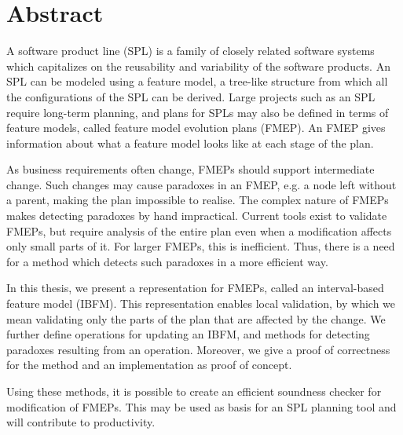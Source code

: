 \chapter*{Abstract}
A software product line (SPL) is a family of closely related software systems which capitalizes on the reusability and variability of the software products. 
An SPL can be modeled using a feature model, a tree-like structure from which all the configurations of the SPL can be derived.
Large projects such as an SPL require long-term planning, and plans for SPLs may also be defined in terms of feature models, called feature model evolution plans (FMEP). An FMEP gives information about what a feature model looks like at each stage of the plan.

As business requirements often change, FMEPs should support intermediate change. Such changes may cause paradoxes in an FMEP,  e.g. a node left without a parent, making the plan impossible to realise. The complex nature of FMEPs makes detecting paradoxes by hand impractical. Current tools exist to validate FMEPs, but require analysis of the entire plan even when a modification affects only small parts of it. For larger FMEPs, this is inefficient. Thus, there is a need for a method which detects such paradoxes in a more efficient way.

In this thesis, we present a representation for FMEPs, called an interval-based feature model (IBFM). This representation enables local validation, by which we mean validating only the parts of the plan that are affected by the change. We further define operations for updating an IBFM, and methods for detecting paradoxes resulting from an operation. Moreover, we give a proof of correctness for the method and an implementation as proof of concept.
 
Using these methods, it is possible to create an efficient soundness checker for modification of FMEPs. This may be used as basis for an SPL planning tool and will contribute to productivity. 


